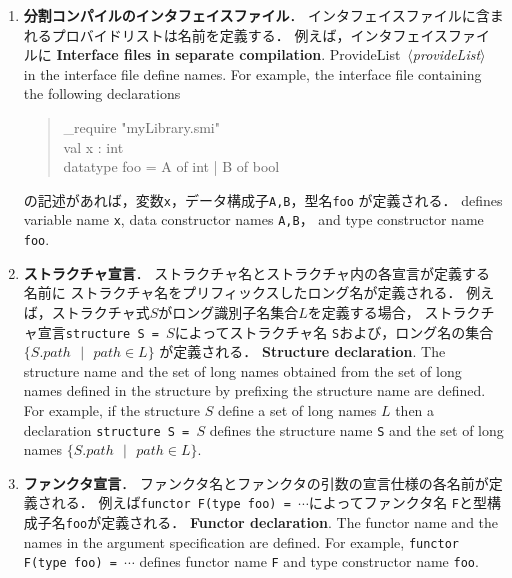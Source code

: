 \documentclass{jbook}
\newcommand{\code}[1]{\mbox{\large\tt #1}}
\newcommand{\vbar}{\mbox{\ $|$\ }}
\newcommand{\nonterm}[1]{\mbox{$\,\langle$}{\it #1}\mbox{$\rangle\,$}}
\newenvironment{program}{\begin{quote}\begin{tt}}%
                        {\end{tt}\end{quote}}
\begin{document}
\begin{enumerate}
\item 
\ifjp%
	{\bf 分割コンパイルのインタフェイスファイル}．
	インタフェイスファイルに含まれるプロバイドリストは名前を定義する．
	例えば，インタフェイスファイルに
\else%
 {\bf Interface files in separate compilation}.
	ProvideList \nonterm{provideList} in the interface file define names.
	For example, the interface file containing the following declarations
\fi%

\begin{program}
\_require "myLibrary.smi"\\
val x : int\\
datatype foo = A of int | B of bool
\end{program}

\ifjp%
の記述があれば，変数\code{x}，データ構成子\code{A,B}，型名\code{foo}
が定義される．
\else%
defines variable name \code{x}, data constructor names \code{A,B}，
and type constructor name \code{foo}.
\fi%

\item
\ifjp%
 {\bf ストラクチャ宣言}．
	ストラクチャ名とストラクチャ内の各宣言が定義する名前に
ストラクチャ名をプリフィックスしたロング名が定義される．
	例えば，ストラクチャ式$S$がロング識別子名集合$L$を定義する場合，
ストラクチャ宣言\code{structure S = $S$}によってストラクチャ名
\code{S}および，ロング名の集合
$\{S.path \vbar path \in L\}$
が定義される．
\else%
 {\bf Structure declaration}.
	The structure name and the set of long names obtained 
from the set of long names defined in the structure by prefixing the
structure name  are defined.
	For example, if the structure $S$ define a set of long names $L$ then
a declaration \code{structure S = $S$} defines the structure name \code{S} and 
the set of long names $\{S.path \vbar path \in L\}$.
\fi%

\item
\ifjp%
 {\bf ファンクタ宣言}．
	ファンクタ名とファンクタの引数の宣言仕様の各名前が定義される．
	例えば\code{functor F(type foo) = $\cdots$}によってファンクタ名
\code{F}と型構成子名\code{foo}が定義される．
\else%
 {\bf Functor declaration}.
	The functor name and the names in the argument specification are
defined.
	For example, \code{functor F(type foo) = $\cdots$} defines
functor name \code{F} and type constructor name \code{foo}.
\fi%


\end{enumerate}
\end{document}
